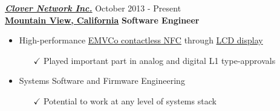 \vspace{8pt}
{\sl \href{http://www.clover.com}{\textbf{Clover Network Inc.}}} \hfill        October 2013 - Present \\
\href{http://www.clover.com/team}{\textbf{Mountain View, California}}       \hfill   \textbf{Software Engineer}
   \begin{itemize} \itemsep -2pt %
   \item High-performance \href{http://www.emvco.com/}{EMVCo contactless NFC} through \href{https://www.clover.com/pos-hardware/mobile}{LCD display}
   \begin{itemize}
   \item[$\checkmark$]
   Played important part in analog and digital L1 type-approvals
   \iftoggle{detailedVersion}{\item[$\checkmark$] NFC through display is extremely difficult - among first in the world to overcome challenge
   \begin{itemize}\item[\tiny$\blacksquare$] Interfaced with cross-functional teams of world experts in NFC
   \item[\tiny$\blacksquare$] Gained expertise in EMVCo contactless protocols, hardware and software
   \end{itemize}}{}
   \end{itemize}

   \item Systems Software and Firmware Engineering
   \begin{itemize}
   \item[$\checkmark$] Potential to work at any level of systems stack
   \iftoggle{detailedVersion}{\item[$\checkmark$] Developed portions of secure payments software
   \begin{itemize}\item[\tiny$\blacksquare$] Developed Linux kernel drivers for custom hardware interfaces
   \item[\tiny$\blacksquare$] Worked on Android OS framework, Android recovery etc.
   \item[\tiny$\blacksquare$] Code written mostly in C, Java, C++ and scripting languages such as Python and bash
   \end{itemize}}{}
   \end{itemize}


\end{itemize}
